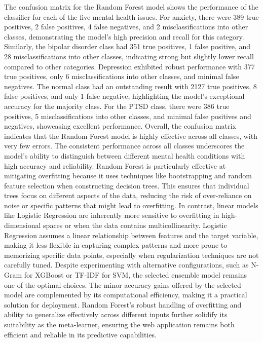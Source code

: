 \noindent
The confusion matrix for the Random Forest model shows the performance of the classifier for each of the five mental health issues. For anxiety, there were 389 true positives, 2 false positives, 4 false negatives, and 2 misclassifications into other classes, demonstrating the model's high precision and recall for this category. Similarly, the bipolar disorder class had 351 true positives, 1 false positive, and 28 misclassifications into other classes, indicating strong but slightly lower recall compared to other categories. Depression exhibited robust performance with 377 true positives, only 6 misclassifications into other classes, and minimal false negatives. The normal class had an outstanding result with 2127 true positives, 8 false positives, and only 1 false negative, highlighting the model’s exceptional accuracy for the majority class. For the PTSD class, there were 386 true positives, 5 misclassifications into other classes, and minimal false positives and negatives, showcasing excellent performance. Overall, the confusion matrix indicates that the Random Forest model is highly effective across all classes, with very few errors. The consistent performance across all classes underscores the model's ability to distinguish between different mental health conditions with high accuracy and reliability. Random Forest is particularly effective at mitigating overfitting because it uses techniques like bootstrapping and random feature selection when constructing decision trees. This ensures that individual trees focus on different aspects of the data, reducing the risk of over-reliance on noise or specific patterns that might lead to overfitting. In contrast, linear models like Logistic Regression are inherently more sensitive to overfitting in high-dimensional spaces or when the data contains multicollinearity. Logistic Regression assumes a linear relationship between features and the target variable, making it less flexible in capturing complex patterns and more prone to memorizing specific data points, especially when regularization techniques are not carefully tuned. Despite experimenting with alternative configurations, such as N-Gram for XGBoost or TF-IDF for SVM, the selected ensemble model remains one of the optimal choices. The minor accuracy gains offered by the selected model are complemented by its computational efficiency, making it a practical solution for deployment. Random Forest’s robust handling of overfitting and ability to generalize effectively across different inputs further solidify its suitability as the meta-learner, ensuring the web application remains both efficient and reliable in its predictive capabilities.


